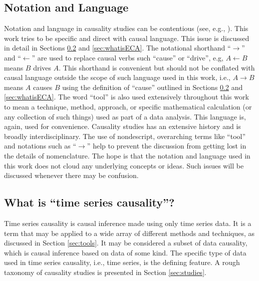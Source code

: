 \documentclass{article}[10pt]
\begin{document}
\subsection{Notation and Language}
Notation and language in causality studies can be contentious (see, e.g., \cite{Illari2014,Pearl2000,Holland1986}).  This work tries to be specific and direct with causal language.  This issue is discussed in detail in Sections \ref{sec:whatis} and \ref{sec:whatisECA}.  The notational shorthand ``$\rightarrow$'' and ``$\leftarrow$'' are used to replace causal verbs such ``cause'' or ``drive'', e.g, $A\leftarrow B$ means $B$ drives $A$.  This shorthand is convenient but should not be conflated with causal language outside the scope of such language used in this work, i.e., $A\rightarrow B$ means $A$ causes $B$ using the definition of ``cause'' outlined in Sections \ref{sec:whatis} and \ref{sec:whatisECA}.  The word ``tool'' is also used extensively throughout this work to mean a technique, method, approach, or specific mathematical calculation (or any collection of such things) used as part of a data analysis.  This language is, again, used for convenience.  Causality studies has an extensive history and is broadly interdisciplinary.  The use of nondescript, overarching terms like ``tool'' and notations such as ``$\rightarrow$'' help to prevent the discussion from getting lost in the details of nomenclature.  The hope is that the notation and language used in this work does not cloud any underlying concepts or ideas.  Such issues will be discussed whenever there may be confusion.

\subsection{What is ``time series causality''?}
\label{sec:whatis}
Time series causality is causal inference made using only time series data.  It is a term that may be applied to a wide array of different methods and techniques, as discussed in Section \ref{sec:tools}.  It may be considered a subset of data causality, which is causal inference based on data of some kind.  The specific type of data used in time series causality, i.e., time series, is the defining feature.  A rough taxonomy of causality studies is presented in Section \ref{sec:studies}.
\end{document}
